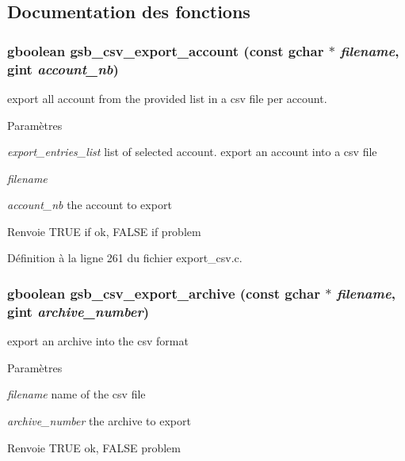 \subsection{Documentation des fonctions}
\subsubsection[{gsb\_\-csv\_\-export\_\-account}]{\setlength{\rightskip}{0pt plus 5cm}gboolean gsb\_\-csv\_\-export\_\-account (const gchar $\ast$ {\em filename}, \/  gint {\em account\_\-nb})}\label{export__csv_8c_abdc7bb25c030ea9a260d4bf9f67e36c9}


export all account from the provided list in a csv file per account. 


\begin{DoxyParams}{Paramètres}
\item[{\em export\_\-entries\_\-list}]list of selected account. export an account into a csv file\item[{\em filename}]\item[{\em account\_\-nb}]the account to export\end{DoxyParams}
\begin{DoxyReturn}{Renvoie}
TRUE if ok, FALSE if problem 
\end{DoxyReturn}


Définition à la ligne 261 du fichier export\_\-csv.c.

\subsubsection[{gsb\_\-csv\_\-export\_\-archive}]{\setlength{\rightskip}{0pt plus 5cm}gboolean gsb\_\-csv\_\-export\_\-archive (const gchar $\ast$ {\em filename}, \/  gint {\em archive\_\-number})}\label{export__csv_8c_a96e088f5208d8fcd8dae087fdc9f5028}
export an archive into the csv format


\begin{DoxyParams}{Paramètres}
\item[{\em filename}]name of the csv file \item[{\em archive\_\-number}]the archive to export\end{DoxyParams}
\begin{DoxyReturn}{Renvoie}
TRUE ok, FALSE problem 
\end{DoxyReturn}


